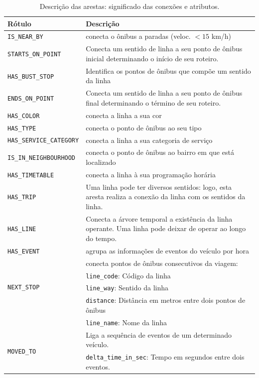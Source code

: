 \begin{table}[!htb]
    \caption{Descrição das arestas: significado das conexões e atributos.}
    \label{tab:arestas}
    \centering
    \small
    \begin{tabular}{ p{5cm}p{8.5cm}} 
    \hline
    Rótulo & Descrição\\
    \hline
    \texttt{IS\_NEAR\_BY}            & conecta o ônibus a paradas (veloc. $< 15$ km/h)\\
    \texttt{STARTS\_ON\_POINT}       & Conecta um sentido de linha a seu ponto de ônibus inicial determinando o início de seu roteiro. \\
    \texttt{HAS\_BUST\_STOP}         & Identifica os pontos de ônibus que compõe um sentido da linha\\
    \texttt{ENDS\_ON\_POINT}         & Conecta um sentido de linha a seu ponto de ônibus final determinando o término de seu roteiro. \\
    \texttt{HAS\_COLOR}              & conecta a linha a sua cor \\ 
    \texttt{HAS\_TYPE}               & conecta o ponto de ônibus ao seu tipo \\ 
    \texttt{HAS\_SERVICE\_CATEGORY}  & conecta a linha a sua categoria de serviço \\ 
    \texttt{IS\_IN\_NEIGHBOURHOOD}   & conecta o ponto de ônibus ao bairro em que está localizado \\ 
    \texttt{HAS\_TIMETABLE}          & conecta a linha à sua programação horária \\ 
    \texttt{HAS\_TRIP}               &  Uma linha pode ter diversos sentidos: logo, esta aresta realiza a conexão da linha com os sentidos da linha. \\ 
    \texttt{HAS\_LINE}               & Conecta a árvore temporal a existência da linha operante. Uma linha pode deixar de operar ao longo do tempo. \\ 
    \texttt{HAS\_EVENT}              & agrupa as informações de eventos do veículo por hora\\
    \hline
    \multirow{4}{*}{\texttt{NEXT\_STOP}} & conecta pontos de ônibus consecutivos da viagem: \\
    & \texttt{line\_code}: Código da linha\\
    & \texttt{line\_way}: Sentido da linha\\
    & \texttt{distance}: Distância em metros entre dois pontos de ônibus \\
    & \texttt{line\_name}: Nome da linha\\
    \hline
    \multirow{4}{*}{\texttt{MOVED\_TO}}           & Liga a sequência de eventos de um determinado veículo. \\
    & \texttt{delta\_time\_in\_sec}: Tempo em segundos entre dois eventos.\\
    \hline
    \end{tabular}
\end{table}






